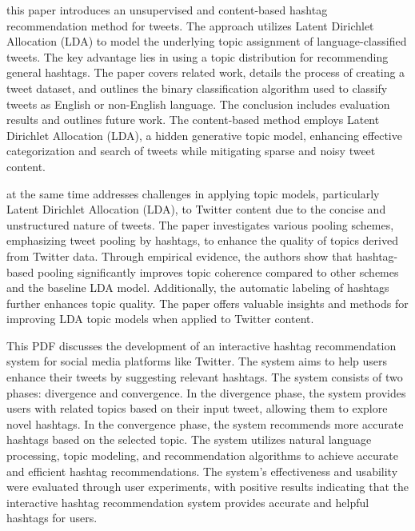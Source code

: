 \cite{godin2013using} this paper introduces an unsupervised and content-based hashtag recommendation method for tweets. The approach utilizes Latent Dirichlet Allocation (LDA) to model the underlying topic assignment of language-classified tweets. The key advantage lies in using a topic distribution for recommending general hashtags. The paper covers related work, details the process of creating a tweet dataset, and outlines the binary classification algorithm used to classify tweets as English or non-English language. The conclusion includes evaluation results and outlines future work. The content-based method employs Latent Dirichlet Allocation (LDA), a hidden generative topic model, enhancing effective categorization and search of tweets while mitigating sparse and noisy tweet content.

\cite{mehrotra2013improving} at the same time addresses challenges in applying topic models, particularly Latent Dirichlet Allocation (LDA), to Twitter content due to the concise and unstructured nature of tweets. The paper investigates various pooling schemes, emphasizing tweet pooling by hashtags, to enhance the quality of topics derived from Twitter data. Through empirical evidence, the authors show that hashtag-based pooling significantly improves topic coherence compared to other schemes and the baseline LDA model. Additionally, the automatic labeling of hashtags further enhances topic quality. The paper offers valuable insights and methods for improving LDA topic models when applied to Twitter content.

This PDF discusses the development of an interactive hashtag recommendation system for social media platforms like Twitter. The system aims to help users enhance their tweets by suggesting relevant hashtags. The system consists of two phases: divergence and convergence. In the divergence phase, the system provides users with related topics based on their input tweet, allowing them to explore novel hashtags. In the convergence phase, the system recommends more accurate hashtags based on the selected topic. The system utilizes natural language processing, topic modeling, and recommendation algorithms to achieve accurate and efficient hashtag recommendations. The system's effectiveness and usability were evaluated through user experiments, with positive results indicating that the interactive hashtag recommendation system provides accurate and helpful hashtags for users.

